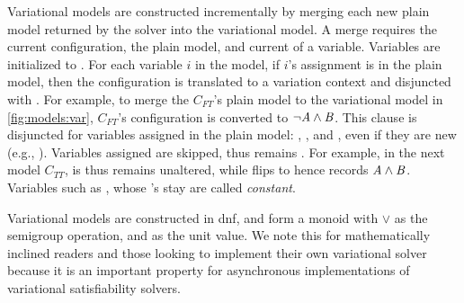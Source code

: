 Variational models are constructed incrementally by merging each new plain model
returned by the solver into the variational model. A merge requires the current
configuration, the plain model, and current \vc{} of a variable. Variables are
initialized to \fls{}. For each variable $i$ in the model, if $i$'s assignment
is \tru{} in the plain model, then the configuration is translated to a
variation context and disjuncted with . For example, to merge the
$C_{FT}$'s plain model to the variational model in \autoref{fig:models:var},
$C_{FT}$'s configuration is converted to $\neg \mathit{A}{} \wedge \mathit{B}{}$. This clause
is disjuncted for variables assigned \tru{} in the plain model: \vc{\aV{}},
\vc{\cV{}}, and \vc{\pV{}}, even if they are new (e.g., \cV{}). Variables
assigned \fls{} are skipped, thus \vc{\qV{}} remains \fls{}. For example, in the
next model $C_{TT}$, \cV{} is \fls{} thus \vc{\cV{}} remains unaltered, while
\vc{\qV{}} flips to \tru{} hence \vc{\qV{}} records $\mathit{A}{} \wedge \mathit{B}{}$.
Variables such as \bV{}, whose \vc{}'s stay \fls{} are called \textit{constant}.

Variational models are constructed in \ac{dnf}, and form a monoid with $\vee$ as
the semigroup operation, and \fls{} as the unit value. We note this for
mathematically inclined readers and those looking to implement their own
variational solver because it is an important property for asynchronous
implementations of variational satisfiability solvers.


